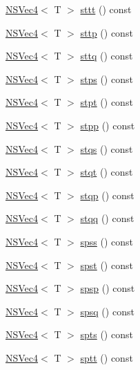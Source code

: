 \begin{DoxyCompactItemize}
\item 
\hyperlink{structNSVec4}{N\-S\-Vec4}$<$ T $>$ \hyperlink{structNSVec4_aa772aacffc67eaafd32d2f96c57a7d2e}{sttt} () const 
\item 
\hyperlink{structNSVec4}{N\-S\-Vec4}$<$ T $>$ \hyperlink{structNSVec4_ac177400f27a412d57c4f9347ae149412}{sttp} () const 
\item 
\hyperlink{structNSVec4}{N\-S\-Vec4}$<$ T $>$ \hyperlink{structNSVec4_a098e9cae18af443f97ccd1de52197f8c}{sttq} () const 
\item 
\hyperlink{structNSVec4}{N\-S\-Vec4}$<$ T $>$ \hyperlink{structNSVec4_ae355c0fd9a91b15872bd5d8a21759d07}{stps} () const 
\item 
\hyperlink{structNSVec4}{N\-S\-Vec4}$<$ T $>$ \hyperlink{structNSVec4_ae3378fee463249b703aa33c2f72ad8f6}{stpt} () const 
\item 
\hyperlink{structNSVec4}{N\-S\-Vec4}$<$ T $>$ \hyperlink{structNSVec4_aa30a044a8f69a31a0173448b2b3d12fb}{stpp} () const 
\item 
\hyperlink{structNSVec4}{N\-S\-Vec4}$<$ T $>$ \hyperlink{structNSVec4_ab99b2ec6dc154f7f5aca6968ed531ff4}{stqs} () const 
\item 
\hyperlink{structNSVec4}{N\-S\-Vec4}$<$ T $>$ \hyperlink{structNSVec4_a510a02039509c636afa8dcff5b4533bb}{stqt} () const 
\item 
\hyperlink{structNSVec4}{N\-S\-Vec4}$<$ T $>$ \hyperlink{structNSVec4_ae8fbe38393c38d70e1abdcd216bddaa8}{stqp} () const 
\item 
\hyperlink{structNSVec4}{N\-S\-Vec4}$<$ T $>$ \hyperlink{structNSVec4_ac9ac7062a5c8a7e2988410cd10d39754}{stqq} () const 
\item 
\hyperlink{structNSVec4}{N\-S\-Vec4}$<$ T $>$ \hyperlink{structNSVec4_a5b7957f9e7c5d49127b0dbb90fafa8d4}{spss} () const 
\item 
\hyperlink{structNSVec4}{N\-S\-Vec4}$<$ T $>$ \hyperlink{structNSVec4_a915fc564b536eb34aa208d2cbd5ab8a5}{spst} () const 
\item 
\hyperlink{structNSVec4}{N\-S\-Vec4}$<$ T $>$ \hyperlink{structNSVec4_aa8f5a685cfdbde14d9a2f077e7363dbe}{spsp} () const 
\item 
\hyperlink{structNSVec4}{N\-S\-Vec4}$<$ T $>$ \hyperlink{structNSVec4_a0249d362d8c54b401149ca1ff6e2e5ac}{spsq} () const 
\item 
\hyperlink{structNSVec4}{N\-S\-Vec4}$<$ T $>$ \hyperlink{structNSVec4_a4b1b5b3e847a8cc2d5860f7bfb8f4e9b}{spts} () const 
\item 
\hyperlink{structNSVec4}{N\-S\-Vec4}$<$ T $>$ \hyperlink{structNSVec4_a9d9bd82a813c2ca99b31b32ac9003672}{sptt} () const 

\end{DoxyCompactItemize}
